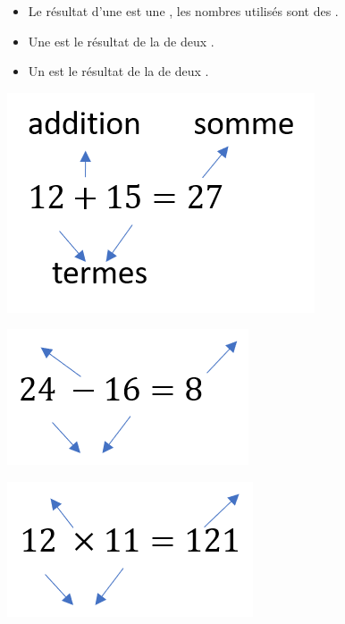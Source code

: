 \documentclass[xcolor={dvipsnames}]{beamer}
\begin{document}
\begin{frame}
	\begin{mydefs}
		
		\begin{itemize}
			
			
			\item Le résultat d'une  est une , les nombres utilisés sont des .
			
			\item Une  est le résultat de la  de deux .
			
			\item Un  est le résultat de la  de deux .
		\end{itemize}
	\end{mydefs}
	
	\begin{center}
		\includegraphics[scale=0.8]{somme}
	\end{center}
\end{frame}

\begin{frame}
	\begin{center}
		\includegraphics[scale=0.8]{difference2}
	\end{center}
	
	\vspace*{1cm}
	\begin{center}
		\includegraphics[scale=0.8]{produit2}
	\end{center}
\end{frame}
\end{document}
